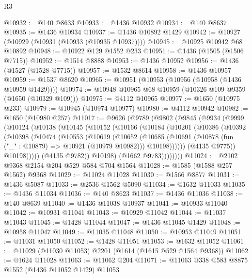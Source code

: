 \begin{lexlean}{R3}
\begin{coremodule}
@10932 := @140 @8633
@10933 := @1436 @10932
@10934 := @140 @8637
@10935 := @1436 @10934
@10937 := @1436 @10892 @1429
@10942 := @10927 (@10929 (@10931 (@10933 (@10935 @10937))))
@10945 := @10925 @10942 @68 @10892
@10948 := @10922 @129 @1552 @233
@10951 := @1436 (@1505 (@1506 @7715))
@10952 := @1514 @8888
@10953 := @1436 @10952
@10956 := @1436 (@1527 (@1528 @7715))
@10957 := @1532 @8614
@10958 := @1436 @10957
@10959 := @1537 @8620
@10965 := @10951 (@10953 (@10956 (@10958 (@1436 @10959 @1429))))
@10974 := @10948 @10965 @68 @10959 (@10326 @109 @9359 (@1650 (@10329 @109)))
@10975 := @4112 @10965
@10977 := @1650 (@10975 @233)
@10979 := @10945 (@10974 @10977)
@10980 := @4112 @10942
@10982 := @1650 (@10980 @257)
@11017 := @9626
    (@9789
      (@9802
        (@9845
          (@9934
            (@9999
              (@10124
                (@10138
                  (@10145
                    (@10152
                      (@10166
                        (@10184
                          (@10201
                            (@10386
                              (@10392
                                (@10398
                                  (@10474
                                    (@10553
                                      (@10619
                                        (@10652
                                          (@10685
                                            (@10691
                                              (@10878
                                                (fun ("_" : @10879) => @10921 (@10979 @10982)))
                                              @10198))))))
                                  (@4135 @9775))
                                @10198)))))
                      (@4135 @9782))
                    @10198)
                  (@1662 @9783))))))))
@11024 := @2102 @9368 @2154 @204 @529 @584 @704 @1564
@11028 := @1585 (@1588 @257 @1562) @9368
@11029 := @11024 @11028
@11030 := @1566 @8877
@11031 := @1436 @5087
@11033 := @2536 @1562 @5090
@11034 := @1632 @11033
@11035 := @1436 @11034
@11036 := @140 @8623
@11037 := @1436 @11036
@11038 := @140 @8639
@11040 := @1436 @11038 @10937
@11041 := @10933 @11040
@11042 := @10931 @11041
@11043 := @10929 @11042
@11044 := @11037 @11043
@11045 := @1428 @11044
@11047 := @1436 @11045 @1429
@11048 := @10958 @11047
@11049 := @11035 @11048
@11050 := @10953 @11049
@11051 := @11031 @11050
@11052 := @1428 @11051
@11053 := @1632 @11052
@11061 := @11029 (@11030 @11053) @2201 (@1614 (@1615 @529 @1564 @9368))
@11062 := @1624 @11028
@11063 := @11062 @204
@11071 := @11063 @338 @583 @8875 @1552 (@1436 @11052 @1429) @11053

\end{coremodule}
\end{lexlean}
